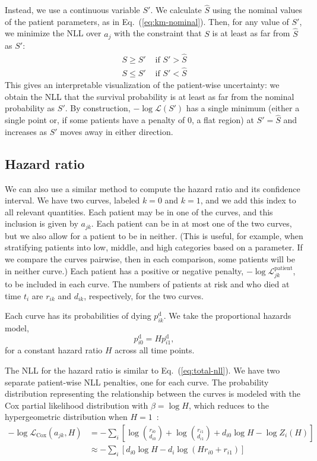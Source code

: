 \documentclass[pdflatex,sn-basic]{sn-jnl}%
\theoremstyle{thmstyleone}%
\theoremstyle{thmstyletwo}%
\theoremstyle{thmstylethree}%
\begin{document}
Instead, we use a continuous variable \(S'\). We calculate \(\hat{S}\) using the nominal values of the patient parameters, as in Eq.~(\ref{eq:km-nominal}). Then, for any value of \(S'\), we minimize the NLL over \(a_j\) with the constraint that \(S\) is at least as far from \(\hat{S}\) as \(S'\):
\begin{align}
S \ge S' & \text{ if } S' > \hat{S} \\
S \le S' & \text{ if } S' < \hat{S}
\end{align}
This gives an interpretable visualization of the patient-wise uncertainty: we obtain the NLL that the survival probability is at least as far from the nominal probability as \(S'\). By construction, \(-\log\mathcal{L}(S')\) has a single minimum (either a single point or, if some patients have a penalty of \(0\), a flat region) at \(S'=\hat{S}\) and increases as \(S'\) moves away in either direction.

\subsection{Hazard ratio}

We can also use a similar method to compute the hazard ratio and its confidence interval.  We have two curves, labeled \(k=0\) and \(k=1\), and we add this index to all relevant quantities. Each patient may be in one of the curves, and this inclusion is given by \(a_{jk}\). Each patient can be in at most one of the two curves, but we also allow for a patient to be in neither. (This is useful, for example, when stratifying patients into low, middle, and high categories based on a parameter\@. If we compare the curves pairwise, then in each comparison, some patients will be in neither curve.)  Each patient has a positive or negative penalty, \(-\log\mathcal{L}_{jk}^\text{patient}\), to be included in each curve. The numbers of patients at risk and who died at time \(t_i\) are \(r_{ik}\) and \(d_{ik}\), respectively, for the two curves.

Each curve has its probabilities of dying \(p^\text{d}_{ik}\). We take the proportional hazards model,
\begin{equation}
p^\text{d}_{i0} = H p^\text{d}_{i1},
\label{eq:proportional-hazards}
\end{equation}
for a constant hazard ratio \(H\) across all time points.

The NLL for the hazard ratio is similar to Eq.~(\ref{eq:total-nll}). We have two separate patient-wise NLL penalties, one for each curve. The probability distribution representing the relationship between the curves is modeled with the Cox partial likelihood distribution with \(\beta=\log{H}\), which reduces to the hypergeometric distribution when \(H=1\)~\citep{cox1972regression,breslow1974covariance}:
\begin{align}
-\log \mathcal{L}_{\text{Cox}}(a_{jk}, H)&=-\sum_i\left[\log\binom{r_{i0}}{d_{i0}}+\log\binom{r_{i1}}{d_{i1}}+d_{i0}\log H-\log Z_i(H)\right] \label{eq:cox-nll-exact}\\
&\approx-\sum_i \left[d_{i0} \log H - d_i \log\left(H r_{i0} + r_{i1}\right)\right] \label{eq:cox-nll-breslow}
\end{align}
\end{document}
